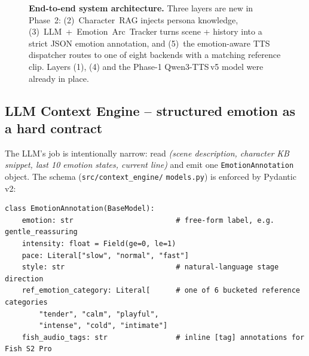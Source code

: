 \documentclass[10pt,a4paper]{article}
\begin{document}
\begin{figure}[t]
{%
}
\caption{\textbf{End-to-end system architecture.} Three layers are new in
Phase~2: \textsc{(2)}~Character~RAG injects persona knowledge,
\textsc{(3)}~LLM~+~Emotion~Arc~Tracker turns scene + history into a strict
JSON emotion annotation, and \textsc{(5)}~the emotion-aware TTS dispatcher
routes to one of eight backends with a matching reference clip. Layers
\textsc{(1)}, \textsc{(4)} and the Phase-1 Qwen3-TTS\,v5 model were already
in place.}
\label{fig:arch}
\end{figure}

\subsection{LLM Context Engine -- structured emotion as a hard contract}

The LLM's job is intentionally narrow: read \emph{(scene description,
character KB snippet, last 10 emotion states, current line)} and emit one
\texttt{EmotionAnnotation} object. The schema (\texttt{src/context\_engine/}
\texttt{models.py}) is enforced by Pydantic v2:

\begin{lstlisting}[style=tinypy]
class EmotionAnnotation(BaseModel):
    emotion: str                        # free-form label, e.g. gentle_reassuring
    intensity: float = Field(ge=0, le=1)
    pace: Literal["slow", "normal", "fast"]
    style: str                          # natural-language stage direction
    ref_emotion_category: Literal[      # one of 6 bucketed reference categories
        "tender", "calm", "playful",
        "intense", "cold", "intimate"]
    fish_audio_tags: str                # inline [tag] annotations for Fish S2 Pro
\end{lstlisting}
\end{document}
